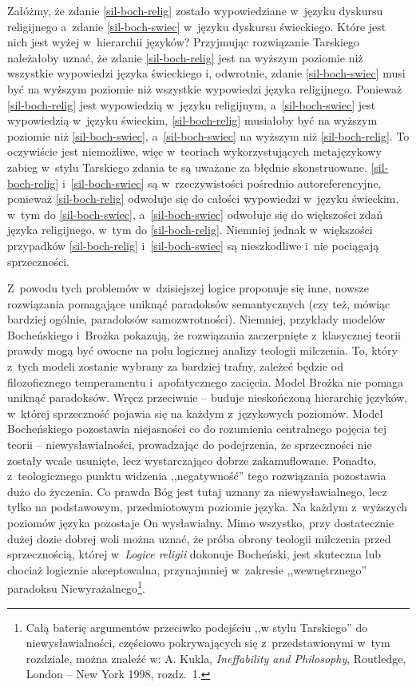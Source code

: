 Załóżmy, że zdanie \ref{sil-boch-relig} zostało wypowiedziane w~języku dyskursu religijnego a~zdanie \ref{sil-boch-swiec} w~języku dyskursu świeckiego. Które jest nich jest wyżej w~hierarchii języków? Przyjmując rozwiązanie Tarskiego należałoby uznać, że zdanie \ref{sil-boch-relig} jest na wyższym poziomie niż wszystkie wypowiedzi języka świeckiego i, odwrotnie, zdanie \ref{sil-boch-swiec} musi być na wyższym poziomie niż wszystkie wypowiedzi języka religijnego. Ponieważ \ref{sil-boch-relig} jest wypowiedzią w~języku religijnym, a~\ref{sil-boch-swiec} jest wypowiedzią w~języku świeckim, \ref{sil-boch-relig} musiałoby być na wyższym poziomie niż \ref{sil-boch-swiec}, a~\ref{sil-boch-swiec} na wyższym niż \ref{sil-boch-relig}. To oczywiście jest niemożliwe, więc w~teoriach wykorzystujących metajęzykowy zabieg w~stylu Tarskiego zdania te są uważane za błędnie skonstruowane. \ref{sil-boch-relig} i~\ref{sil-boch-swiec} są w~rzeczywistości pośrednio autoreferencyjne, ponieważ \ref{sil-boch-relig} odwołuje się do całości wypowiedzi w~języku świeckim, w~tym do \ref{sil-boch-swiec}, a~\ref{sil-boch-swiec} odwołuje się do większości zdań języka religijnego, w~tym do \ref{sil-boch-relig}. Niemniej jednak w~większości przypadków \ref{sil-boch-relig} i~\ref{sil-boch-swiec} są nieszkodliwe i~nie pociągają sprzeczności.

Z~powodu tych problemów w~dzisiejszej logice proponuje się inne, nowsze rozwiązania pomagające uniknąć paradoksów semantycznych (czy też, mówiąc bardziej ogólnie, paradoksów samozwrotności). Niemniej, przykłady modelów Bocheńskiego i~Brożka pokazują, że rozwiązania zaczerpnięte z~klasycznej teorii prawdy mogą być owocne na polu logicznej analizy teologii milczenia. To, który z~tych modeli zostanie wybrany za bardziej trafny, zależeć będzie od filozoficznego temperamentu i~apofatycznego zacięcia. Model Brożka nie pomaga uniknąć paradoksów. Wręcz przeciwnie -- buduje nieskończoną hierarchię języków, w~której sprzeczność pojawia się na każdym z~językowych poziomów. Model Bocheńskiego pozostawia niejasności co do rozumienia centralnego pojęcia tej teorii -- niewysławialności, prowadzając do podejrzenia, że sprzeczności nie zostały wcale usunięte, lecz wystarczająco dobrze zakamuflowane. Ponadto, z~teologicznego punktu widzenia ,,negatywność'' tego rozwiązania pozostawia dużo do życzenia. Co prawda Bóg jest tutaj uznany za niewysławialnego, lecz tylko na podstawowym, przedmiotowym poziomie języka. Na każdym z~wyższych poziomów języka pozostaje On wysławialny. Mimo wszystko, przy dostatecznie dużej dozie dobrej woli można uznać, że próba obrony teologii milczenia przed sprzecznością, której w~\textit{Logice religii} dokonuje Bocheński, jest skuteczna lub chociaż logicznie akceptowalna, przynajmniej w~zakresie ,,wewnętrznego'' paradoksu Niewyrażalnego\footnote{Całą baterię argumentów przeciwko podejściu ,,w stylu Tarskiego'' do niewysławialności, częściowo pokrywających się z~przedstawionymi w~tym rozdziale, można znaleźć w: A. Kukla, \textit{Ineffability and Philosophy}, Routledge, London -- New York 1998, rozdz.~1.}.

